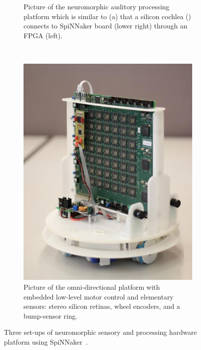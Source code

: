 \begin{figure}[tbp!]
\begin{subfigure}[t]{0.528\textwidth}
		\caption{Picture of the neuromorphic auditory processing platform which is similar to (a) \DIFaddbeginFL {}\DIFaddendFL that a silicon cochlea (\DIFdelbeginFL {}\DIFdelendFL \DIFaddbeginFL {}\DIFaddendFL ) connects to \DIFaddbeginFL {}\DIFaddendFL SpiNNaker board (lower right) through an FPGA (left).}
	\end{subfigure}
	~~
	\begin{subfigure}[t]{0.4\textwidth}
		\includegraphics[width=\textwidth]{pics_snn/omnibot.jpg}
		\caption{Picture of the omni-directional platform with embedded low-level motor control and elementary sensors: stereo silicon retinas, wheel encoders, and a bump-sensor ring.}
	\end{subfigure}
	\caption{Three set-ups of neuromorphic sensory and processing hardware platform using SpiNNaker~\citep{furber2014spinnaker}.}
	\label{Fig:close-loop}
\end{figure}

